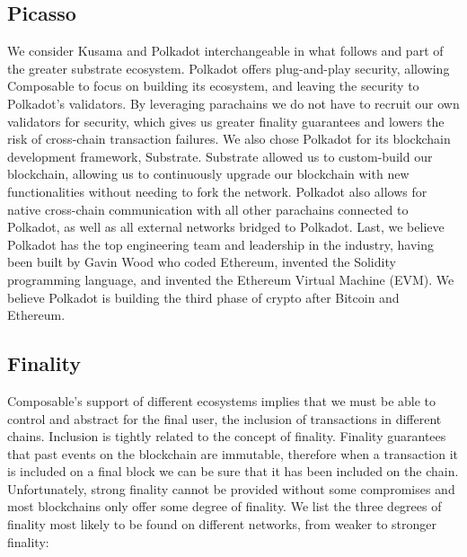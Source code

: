 \subsection{Picasso}

We consider Kusama and Polkadot interchangeable in what follows and part of the greater substrate ecosystem.
%
Polkadot offers plug-and-play security, allowing Composable to focus on building its ecosystem, and leaving the security to Polkadot’s validators.
%
By leveraging parachains we do not have to recruit our own validators for security, which gives us greater finality guarantees and lowers the risk of cross-chain transaction failures. We also chose Polkadot for its blockchain development framework, Substrate. Substrate allowed us to custom-build our blockchain, allowing us to continuously upgrade our blockchain with new functionalities without needing to fork the network.
%
Polkadot also allows for native cross-chain communication with all other parachains connected to Polkadot, as well as all external networks bridged to Polkadot.
%
Last, we believe Polkadot has the top engineering team and leadership in the industry, having been built by Gavin Wood who coded Ethereum, invented the Solidity programming language, and invented the Ethereum Virtual Machine (EVM). We believe Polkadot is building the third phase of crypto after Bitcoin and Ethereum.


\subsection{Finality}
Composable's support of different ecosystems implies that we must be able to control and abstract for the final user, the inclusion of transactions in different chains. Inclusion is tightly related to the concept of finality. Finality guarantees that past events on the blockchain are immutable, therefore when a transaction it is included on a final block we can be sure that it has been included on the chain. Unfortunately, strong finality cannot be provided without some compromises \cite{Brewer2012Cap} and most blockchains only offer some degree of finality. We list the three degrees of finality most likely to be found on different networks, from weaker to stronger finality:

